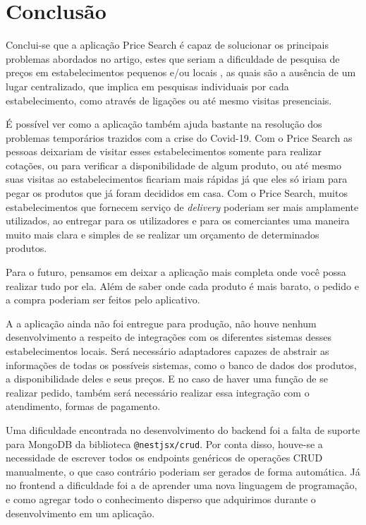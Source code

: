 \section{Conclusão}
Conclui-se que a aplicação Price Search é capaz de solucionar os principais problemas abordados no artigo, estes que seriam a dificuldade de pesquisa de preços em estabelecimentos pequenos e/ou locais , as quais são a ausência de um lugar centralizado, que implica em pesquisas individuais por cada estabelecimento, como através de ligações ou até mesmo visitas presenciais. 

É possível ver como a aplicação também ajuda bastante na resolução dos problemas temporários trazidos com a crise do Covid-19. Com o Price Search as pessoas deixariam de visitar esses estabelecimentos somente para realizar cotações, ou para verificar a disponibilidade de algum produto, ou até mesmo suas visitas ao estabelecimentos ficariam mais rápidas já que eles só iriam para pegar os produtos que já foram decididos em casa. Com o Price Search, muitos estabelecimentos que fornecem serviço de \textit{delivery} poderiam ser mais amplamente utilizados, ao entregar para os utilizadores e para os comerciantes uma maneira muito mais clara e simples de se realizar um orçamento de determinados produtos.

Para o futuro, pensamos em deixar a aplicação mais completa onde você possa realizar tudo por ela. Além de saber onde cada produto é mais barato, o pedido e a compra poderiam ser feitos pelo aplicativo.

A a aplicação ainda não foi entregue para produção, não houve nenhum desenvolvimento a respeito de integrações com os diferentes sistemas desses estabelecimentos locais. Será necessário adaptadores capazes de abstrair as informações de todas os possíveis sistemas, como o banco de dados dos produtos, a disponibilidade deles e seus preços. E no caso de haver uma função de se realizar pedido, também será necessário realizar essa integração com o atendimento, formas de pagamento.

Uma dificuldade encontrada no desenvolvimento do backend foi a falta de suporte para MongoDB da biblioteca \texttt{@nestjsx/crud}. Por conta disso, houve-se a necessidade de escrever todos os endpoints genéricos de operações CRUD manualmente, o que caso contrário poderiam ser gerados de forma automática. Já no frontend a dificuldade foi a de aprender uma nova linguagem de programação, e como agregar todo o conhecimento disperso que adquirimos durante o desenvolvimento em um aplicação.

\begin{comment}
Aqui também é um comentário
\end{comment}